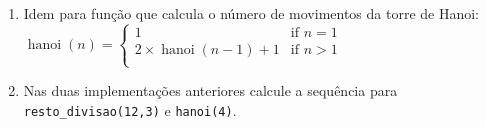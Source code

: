 \documentclass[11pt, a4paper,final]{article}
\begin{document}
\begin{enumerate}
\begin{enumerate}
\item Idem para função que calcula o número de movimentos da torre de Hanoi:\\
$
\operatorname{hanoi}(n) =
 \begin{cases}
 1 & \mbox{if } n = 1 \\
 2\times\operatorname{hanoi}(n-1) + 1 & \mbox{if } n > 1\\
 \end{cases}
$ 

\item Nas duas implementações anteriores calcule a sequência para  \texttt{resto\_divisao(12,3)} e 
\texttt{hanoi(4)}.
 
\end{enumerate}




  



\end{enumerate}
\end{document}
